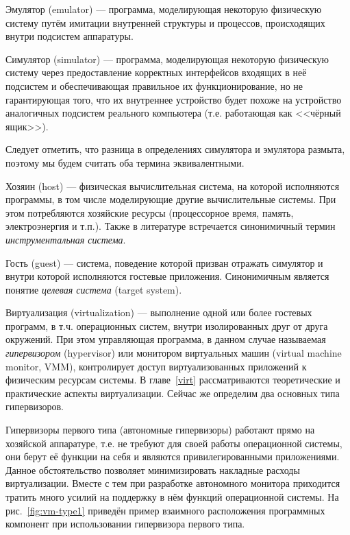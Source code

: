 \begin{description*}

\item[Эмулятор] (\abbr emulator) --- программа, моделирующая некоторую физическую систему путём имитации внутренней структуры и процессов, происходящих внутри подсистем аппаратуры.

\item[Симулятор] (\abbr simulator) --- программа, моделирующая некоторую физическую систему через предоставление корректных интерфейсов входящих в неё подсистем и обеспечивающая правильное их функционирование, но не гарантирующая того, что их внутреннее устройство будет похоже на устройство аналогичных подсистем реального компьютера (т.е. работающая как <<чёрный ящик>>). 

Следует отметить, что разница в определениях симулятора и эмулятора размыта, поэтому мы будем считать оба термина эквивалентными.

\item[Хозяин] (\abbr host) ---  физическая вычислительная система, на которой исполняются программы, в том числе моделирующие другие вычислительные системы. При этом потребляются хозяйские ресурсы (процессорное время, память, электроэнергия и т.п.). Также в литературе встречается синонимичный термин \textit{инструментальная система}.

\item[Гость] (\abbr guest) ---  система, поведение которой призван отражать симулятор и внутри которой исполняются гостевые приложения. Синонимичным является понятие \textit{целевая система} (\abbr target system).

\item[Виртуализация] (\abbr virtualization) --- выполнение одной или более гостевых программ, в т.ч. операционных систем, внутри изолированных друг от друга окружений. При этом управляющая программа, в данном случае называемая \textit{гипервизором} (\abbr hypervisor) или монитором виртуальных машин (\abbr virtual machine monitor, VMM), контролирует доступ виртуализованных приложений к физическим ресурсам системы.  В главе~\ref{virt} рассматриваются теоретические и практические аспекты виртуализации. Сейчас же определим два основных типа гипервизоров.

\item[Гипервизоры первого типа] (автономные гипервизоры) работают прямо на хозяйской аппаратуре, т.е. не требуют для своей работы операционной системы, они берут её функции на себя и являются привилегированными приложениями. Данное обстоятельство позволяет минимизировать накладные расходы виртуализации. Вместе с тем при разработке автономного монитора приходится тратить много усилий на поддержку в нём функций операционной системы. На рис.~\ref{fig:vm-type1} приведён пример взаимного расположения программных компонент при использовании гипервизора первого типа.


\end{description*}
